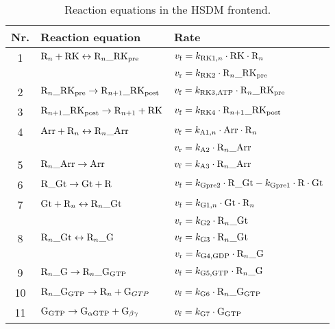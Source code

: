 \documentclass[a4paper, 12pt]{book}
\begin{document}
\begin{table}[H]
\centering
\caption{Reaction equations in the HSDM frontend.}
\begin{tabular}{c | l | l}
Nr. & Reaction equation & Rate \\
\hline
\hline
1 & ${\rm R}_n + {\rm RK} \leftrightarrow {\rm R}_n\_{\rm RK}_{\rm pre}$ & $v_{\rm f} = k_{{\rm RK1,}n} \cdot {\rm RK} \cdot {\rm R}_n$\\
 & & $v_{\rm r} =  k_{\rm RK2} \cdot {\rm R}_n\_{\rm RK}_{\rm pre} $\\
\hline
2 & ${\rm R}_n\_{\rm RK}_{\rm pre} \rightarrow {\rm R}_{n+1}\_{\rm RK}_{\rm post}$ & $v_{\rm f} =  k_{\rm RK3,ATP} \cdot {\rm R}_n\_{\rm RK}_{\rm pre} $\\
\hline
3 & ${\rm R}_{n+1}\_{\rm RK}_{\rm post} \rightarrow {\rm R}_{n+1} + {\rm RK}$ & $v_{\rm f} =  k_{\rm RK4} \cdot {\rm R}_{n+1}\_{\rm RK}_{\rm post} $\\
\hline
4 & ${\rm Arr} + {\rm R}_n \leftrightarrow {\rm R}_n\_{\rm Arr}$ & $v_{\rm f} = k_{{\rm A1,}n} \cdot {\rm Arr} \cdot {\rm R}_n $\\
 & & $v_{\rm r} = k_{\rm A2} \cdot {\rm R}_n\_{\rm Arr} $\\
\hline
5 & ${\rm R}_n\_{\rm Arr} \rightarrow {\rm Arr}$ & $v_{\rm f} =  k_{\rm A3} \cdot {\rm R}_n\_{\rm Arr} $\\
\hline
6 & ${\rm R}\_{\rm Gt} \rightarrow {\rm Gt} + {\rm R}$ & $v_{\rm f} =  k_{\rm Gpre2} \cdot {\rm R}\_{\rm Gt} - k_{\rm Gpre1} \cdot {\rm R} \cdot {\rm Gt} $\\
\hline
7 & ${\rm Gt} + {\rm R}_n \leftrightarrow {\rm R}_n\_{\rm Gt}$ & $v_{\rm f} = k_{{\rm G1,}n} \cdot {\rm Gt} \cdot {\rm R}_n $\\
 & & $v_{\rm r} = k_{\rm G2} \cdot {\rm R}_n\_{\rm Gt}$\\
\hline
8 & ${\rm R}_n\_{\rm Gt} \leftrightarrow {\rm R}_n\_{\rm G}$ & $v_{\rm f} = k_{\rm G3} \cdot {\rm R}_n\_{\rm Gt}$\\
 & & $v_{\rm r} = k_{\rm G4,GDP} \cdot {\rm R}_n\_{\rm G} $\\
\hline
9 & ${\rm R}_n\_{\rm G} \rightarrow {\rm R}_n\_{\rm G}_{\rm GTP}$ & $v_{\rm f} = k_{\rm G5,GTP} \cdot {\rm R}_n\_{\rm G}$\\
\hline
10 & ${\rm R}_n\_{\rm G}_{\rm GTP} \rightarrow {\rm R}_n + {\rm G}_{GTP}$ & $v_{\rm f} = k_{\rm G6} \cdot {\rm R}_n\_{\rm G}_{\rm GTP}$\\
\hline
11 & ${\rm G}_{\rm GTP} \rightarrow {\rm G}_{\alpha{\rm GTP}} + {\rm G}_{\beta\gamma}$ & $v_{\rm f} =  k_{\rm G7} \cdot {\rm G}_{\rm GTP}$\\

\end{tabular}
\end{table}
\end{document}
